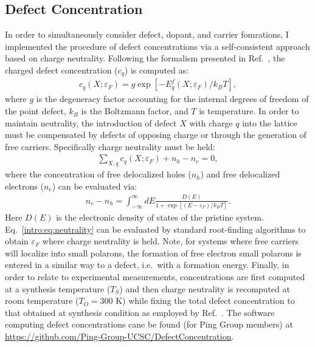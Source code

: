 \subsection{Defect Concentration}
In order to simultaneously consider defect, dopant, and carrier fomrations, I implemented the procedure of defect concentrations via a self-consistent approach based on charge neutrality. Following the formalism presented in Ref.~\cite{freysoldt2014first}, the charged defect concentration ($c_q$) is computed as:
\begin{align}
    c_q(X; \varepsilon_F) = g \exp [- E^f_q(X; \varepsilon_F) / k_B T],
\end{align}
where $g$ is the degeneracy factor accounting for the internal degrees of freedom of the point defect, $k_B$ is the Boltzmann factor, and $T$ is temperature. In order to maintain neutrality, the introduction of defect $X$ with charge $q$ into the lattice must be compensated by defects of opposing charge or through the generation of free carriers. Specifically charge neutrality must be held:
\begin{align}
    \sum_{X,q} c_q(X; \varepsilon_F) + n_h - n_e = 0, \label{intro:eq:neutrality}
\end{align}
where the concentration of free delocalized holes ($n_h$) and free delocalized electrons ($n_e$) can be evaluated via:
\begin{align}
    n_e - n_h = \int_{-\infty}^{\infty} dE \frac{D(E)}{1+\exp[(E-\varepsilon_F)/k_B T]}.
\end{align}
Here $D(E)$ is the electronic density of states of the pristine system. Eq.~\ref{intro:eq:neutrality} can be evaluated by standard root-finding algorithms to obtain $\varepsilon_F$ where charge neutrality is held.
Note, for systems where free carriers will localize into small polarons, the formation of free electron small polarons is entered in a similar way to a defect, i.e.\ with a formation energy.
Finally, in order to relate to experimental measurements, concentrations are first computed at a synthesis temperature ($T_S$) and then charge neutrality is recomputed at room temperature ($T_O=300$ K) while fixing the total defect concentration to that obtained at synthesis condition as employed by Ref.~\cite{lee2013thermodynamics}.
The software computing defect concentrations cane be found (for Ping Group members) at \url{https://github.com/Ping-Group-UCSC/DefectConcentration}.


